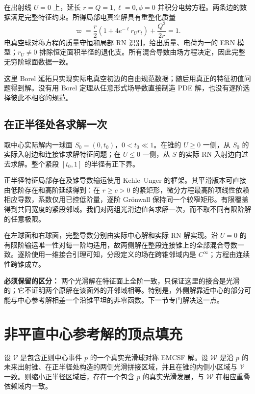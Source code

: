 在出射线 $U=0$ 上，延长 $r=Q=1,\ell=0,\phi=0$ 并积分电势方程。两条边的数据满足完整特征约束。所得局部电真空解具有重整化质量
\[
\varpi=\frac r2(1+4e^{-\ell}r_Ur_t)+\frac{Q^2}{2r}=1.
\]
电真空球对称方程的质量守恒和局部 RN 识别，给出质量、电荷为一的 ERN 模型；$r_U\ne0$ 排除恒定面积半径的退化支。所有混合导数由场方程决定，因此完整无穷阶球面数据一致。

这里 Borel 延拓只实现实际电真空初边的自由规范数据；随后用真正的特征初值问题得到解。没有用 Borel 定理从任意形式场导数直接制造 PDE 解，也没有逐阶选择彼此不相容的规范。

\subsection{在正半径处各求解一次}
取中心实际解内一球面 $S_0=(0,t_0)$，$0<t_0\ll1$。在锥的 $U\ge0$ 一侧，从 $S_0$ 的实际入射边和连接锥求解特征问题；在 $U\le0$ 一侧，从 $S$ 的实际 RN 入射边向过去求解。整个紧段 $[t_0,1]$ 的半径有正下界。

正半径特征局部存在及锥导数输运使用 Kehle--Unger 的框架\cite{KU}。其平滑版本可直接由低阶存在和高阶延续得到：在 $r\ge c>0$ 的紧矩形，微分方程最高阶项线性依赖相应导数，系数仅用已控低阶量，逐阶 Gr\"onwall 保持同一个较窄矩形。有限覆盖得到共同宽度的紧段邻域。我们对两组光滑边值各求解一次，而不取不同有限阶解的任意极限。

在左球面和右球面，完整导数分别由实际中心解和实际 RN 解实现。沿 $U=0$ 的有限阶输运唯一性对每一阶均适用，故两侧解在整段连接锥上的全部混合导数一致。逐阶使用一维接合引理可知，分段定义的场在跨锥邻域内是 $C^\infty$；方程由连续性跨锥成立。

\textbf{必须保留的区分：} 两个光滑解在特征面上全阶一致，只保证这里的接合是光滑的；它不证明两个原解在该面外的开邻域相等。特别是，外侧解靠近中心的部分可能与中心参考解相差一个沿锥平坦的非零函数。下一节专门解决这一点。

\section{非平直中心参考解的顶点填充}

\begin{lemma}[相对平坦误差的中心填充]\label{lem:fill}
设 $\mathcal V$ 是包含正则中心事件 $p$ 的一个真实光滑球对称 EMCSF 解。设 $\mathcal W$ 是沿 $p$ 的未来出射锥、在正半径处构造的两侧光滑拼接区域，并且在锥的内侧小区域与 $\mathcal V$ 一致。则缩小正半径区域后，存在一个包含 $p$ 的真实光滑发展，与 $\mathcal W$ 在相应重叠依赖域内一致。
\end{lemma}

